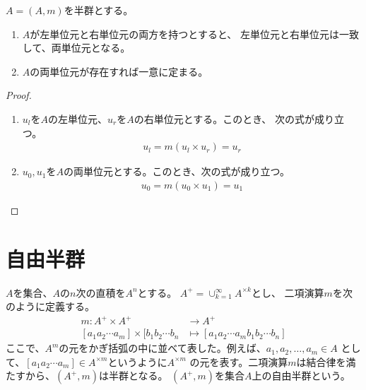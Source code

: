	\begin{proposition}[単位元の一意性]\label{prop:単位元の一意性} %
		$A=(A,m)$を半群とする。
		\begin{enumerate}
			\item $A$が左単位元と右単位元の両方を持つとすると、
			左単位元と右単位元は一致して、両単位元となる。
			\item $A$の両単位元が存在すれば一意に定まる。
		\end{enumerate}
	\end{proposition} %
	\begin{proof}
		\begin{enumerate}
			\item $u_l$を$A$の左単位元、$u_r$を$A$の右単位元とする。このとき、
			次の式が成り立つ。
			\begin{equation*}\begin{split}
				u_l = m(u_l\times u_r) = u_r
			\end{split}\end{equation*}
			\item $u_0,u_1$を$A$の両単位元とする。このとき、次の式が成り立つ。
			\begin{equation*}\begin{split}
				u_0 = m(u_0\times u_1) = u_1
			\end{split}\end{equation*}
		\end{enumerate}
	\end{proof}

\section{自由半群}\label{s1:自由半群} %
	\begin{definition}[自由半群]\label{def:自由半群} %
		$A$を集合、$A$の$n$次の直積を$A^n$とする。 $A^+=\cup_{k=1}^\infty A^{\times k}$とし、
		二項演算$m$を次のように定義する。
		\begin{equation*}\begin{split}
			m: A^+ \times A^+ &\to A^+ \\
				[a_1 a_2\cdots a_m] \times [b_1 b_2 \cdots b_n
					&\mapsto [a_1 a_2\cdots a_m b_1 b_2 \cdots b_n]
		\end{split}\end{equation*}
		ここで、$A^m$の元をかぎ括弧の中に並べて表した。例えば、$a_1,a_2,\dots,a_m\in A$
		として、$[a_1 a_2\cdots a_m]\in A^{\times m}$というように$A^{\times m}$
		の元を表す。二項演算$m$は結合律を満たすから、$(A^+,m)$は半群となる。
		$(A^+,m)$を集合$A$上の自由半群という。
	\end{definition} %

